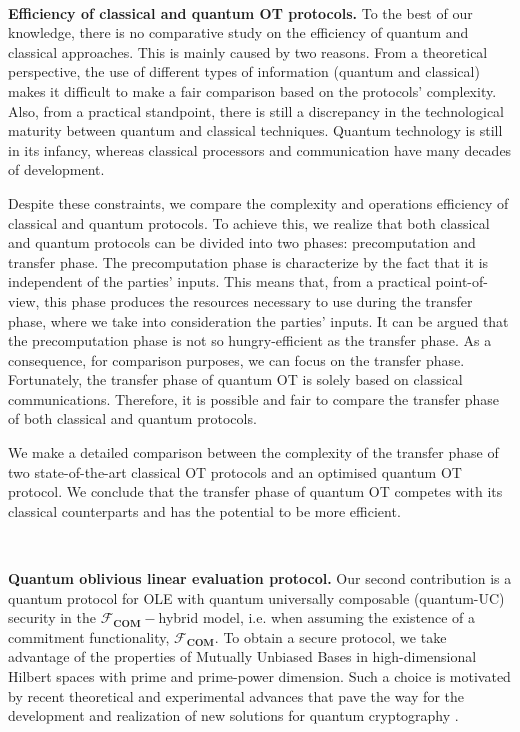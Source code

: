 \

\noindent\textbf{Efficiency of classical and quantum OT protocols.} To the best of our knowledge, there is no comparative study on the efficiency of quantum and classical approaches. This is mainly caused by two reasons. From a theoretical perspective, the use of different types of information (quantum and classical) makes it difficult to make a fair comparison based on the protocols' complexity. Also, from a practical standpoint, there is still a discrepancy in the technological maturity between quantum and classical techniques. Quantum technology is still in its infancy,  whereas classical processors and communication have many decades of development. 

Despite these constraints, we compare the complexity and operations efficiency of classical and quantum protocols. To achieve this, we realize that both classical and quantum protocols can be divided into two phases: precomputation and transfer phase. The precomputation phase is characterize by the fact that it is independent of the parties' inputs. This means that, from a practical point-of-view, this phase produces the resources necessary to use during the transfer phase, where we take into consideration the parties' inputs. It can be argued that the precomputation phase is not so hungry-efficient as the transfer phase. As a consequence, for comparison purposes, we can focus on the transfer phase. Fortunately, the transfer phase of quantum OT is solely based on classical communications. Therefore, it is possible and fair to compare the transfer phase of both classical and quantum protocols. 

We make a detailed comparison between the complexity of the transfer phase of two state-of-the-art classical OT protocols \cite{ALSZ13, KOS15} and an optimised quantum OT protocol. We conclude that the transfer phase of quantum OT competes with its classical counterparts and has the potential to be more efficient.

\

\noindent\textbf{Quantum oblivious linear evaluation protocol.} Our second contribution is a quantum protocol for OLE with quantum universally composable (quantum-UC) security in the $\mathcal{F}_{\textbf{COM}}-$hybrid model, i.e. when assuming the existence of a commitment functionality, $\mathcal{F}_{\textbf{COM}}$. To obtain a secure protocol, we take advantage of the properties of Mutually Unbiased Bases in high-dimensional Hilbert spaces with prime and prime-power dimension. Such a choice is motivated by recent theoretical and experimental advances that pave the way for the development and realization of new solutions for quantum cryptography \cite{BPT00,DEBZ10,Zhongetal2015,BHVBFHM18,DHMPPV21}. 

